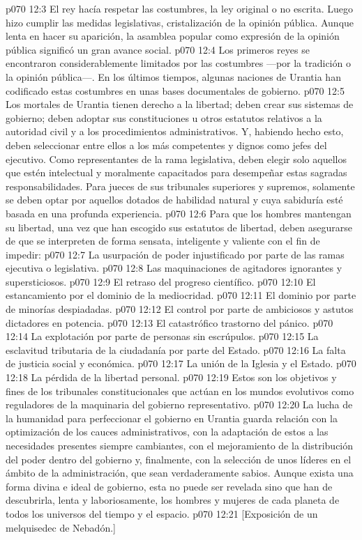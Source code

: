 \vs p070 12:3 El rey hacía respetar las costumbres, la ley original o no escrita. Luego hizo cumplir las medidas legislativas, cristalización de la opinión pública. Aunque lenta en hacer su aparición, la asamblea popular como expresión de la opinión pública significó un gran avance social.
\vs p070 12:4 Los primeros reyes se encontraron considerablemente limitados por las costumbres ---por la tradición o la opinión pública---. En los últimos tiempos, algunas naciones de Urantia han codificado estas costumbres en unas bases documentales de gobierno.
\vs p070 12:5 \pc Los mortales de Urantia tienen derecho a la libertad; deben crear sus sistemas de gobierno; deben adoptar sus constituciones u otros estatutos relativos a la autoridad civil y a los procedimientos administrativos. Y, habiendo hecho esto, deben seleccionar entre ellos a los más competentes y dignos como jefes del ejecutivo. Como representantes de la rama legislativa, deben elegir solo aquellos que estén intelectual y moralmente capacitados para desempeñar estas sagradas responsabilidades. Para jueces de sus tribunales superiores y supremos, solamente se deben optar por aquellos dotados de habilidad natural y cuya sabiduría esté basada en una profunda experiencia.
\vs p070 12:6 Para que los hombres mantengan su libertad, una vez que han escogido sus estatutos de libertad, deben asegurarse de que se interpreten de forma sensata, inteligente y valiente con el fin de impedir:
\vs p070 12:7 La usurpación de poder injustificado por parte de las ramas ejecutiva o legislativa.
\vs p070 12:8 Las maquinaciones de agitadores ignorantes y supersticiosos.
\vs p070 12:9 El retraso del progreso científico.
\vs p070 12:10 El estancamiento por el dominio de la mediocridad.
\vs p070 12:11 El dominio por parte de minorías despiadadas.
\vs p070 12:12 El control por parte de ambiciosos y astutos dictadores en potencia.
\vs p070 12:13 El catastrófico trastorno del pánico.
\vs p070 12:14 La explotación por parte de personas sin escrúpulos.
\vs p070 12:15 La esclavitud tributaria de la ciudadanía por parte del Estado.
\vs p070 12:16 La falta de justicia social y económica.
\vs p070 12:17 La unión de la Iglesia y el Estado.
\vs p070 12:18 La pérdida de la libertad personal.
\vs p070 12:19 \pc Estos son los objetivos y fines de los tribunales constitucionales que actúan en los mundos evolutivos como reguladores de la maquinaria del gobierno representativo.
\vs p070 12:20 La lucha de la humanidad para perfeccionar el gobierno en Urantia guarda relación con la optimización de los cauces administrativos, con la adaptación de estos a las necesidades presentes siempre cambiantes, con el mejoramiento de la distribución del poder dentro del gobierno y, finalmente, con la selección de unos líderes en el ámbito de la administración, que sean verdaderamente sabios. Aunque exista una forma divina e ideal de gobierno, esta no puede ser revelada sino que han de descubrirla, lenta y laboriosamente, los hombres y mujeres de cada planeta de todos los universos del tiempo y el espacio.
\vsetoff
\vs p070 12:21 [Exposición de un melquisedec de Nebadón.]
